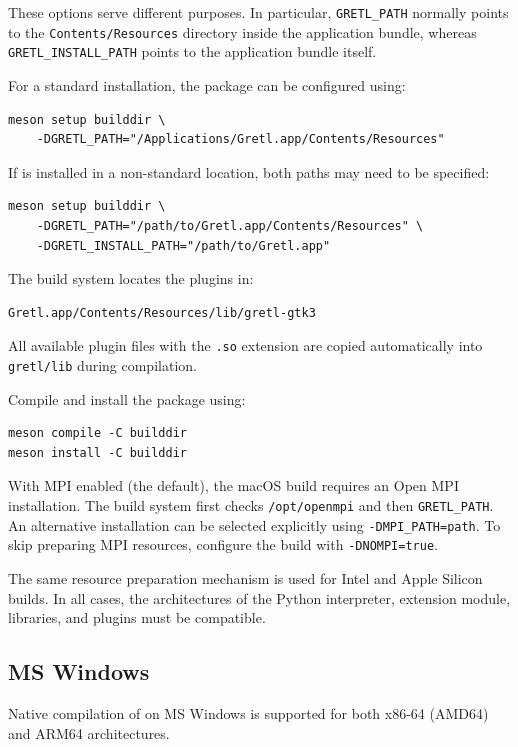 These options serve different purposes. In particular,
\texttt{GRETL\_PATH} normally points to the
\texttt{Contents/Resources} directory inside the application
bundle, whereas \texttt{GRETL\_INSTALL\_PATH} points to the
application bundle itself.

For a standard installation, the package can be configured
using:

\begin{verbatim}
meson setup builddir \
	-DGRETL_PATH="/Applications/Gretl.app/Contents/Resources"
\end{verbatim}

If \gretl is installed in a non-standard location, both
paths may need to be specified:

\begin{verbatim}
meson setup builddir \
	-DGRETL_PATH="/path/to/Gretl.app/Contents/Resources" \
	-DGRETL_INSTALL_PATH="/path/to/Gretl.app"
\end{verbatim}

The build system locates the plugins in:

\begin{verbatim}
Gretl.app/Contents/Resources/lib/gretl-gtk3
\end{verbatim}

All available plugin files with the \texttt{.so} extension
are copied automatically into \texttt{gretl/lib} during
compilation.

Compile and install the package using:

\begin{verbatim}
meson compile -C builddir
meson install -C builddir
\end{verbatim}

With MPI enabled (the default), the macOS build requires an
Open MPI installation. The build system first checks
\texttt{/opt/openmpi} and then \texttt{GRETL\_PATH}.
An alternative installation can be selected explicitly using
\texttt{-DMPI\_PATH=path}. To skip preparing MPI resources,
configure the build with \texttt{-DNOMPI=true}.

The same resource preparation mechanism is used for Intel and
Apple Silicon builds. In all cases, the architectures of the Python
interpreter, extension module, \lgretl libraries, and plugins
must be compatible.


\subsection{MS Windows}\label{sec:windows-compile}
Native compilation of \gretlpy on MS Windows is supported
for both x86-64 (AMD64) and ARM64 architectures.

